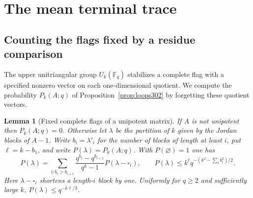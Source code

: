\documentclass[a4paper,11pt]{article}
\newtheorem{lemma}[proposition]{Lemma}
\theoremstyle{definition}
\theoremstyle{remark}
\numberwithin{equation}{section}
\begin{document}
\section{The mean terminal trace}\label{nav:g-XI-3}


\subsection{Counting the flags fixed by a residue comparison}\label{nav:III-65}
The upper unitriangular group \(U_k(\mathbb F_q)\) stabilizes
a complete flag with a specified nonzero vector on each
one-dimensional quotient. We compute the probability
\(P_k(A;q)\) of Proposition~\ref{prop:loops302} by forgetting
these quotient vectors.

\begin{lemma}[Fixed complete flags of a unipotent matrix]\leavevmode
\label{lem:fixedflags302}
If \(A\) is not unipotent then \(P_k(A;q)=0\).
Otherwise let \(\lambda\) be the partition of \(k\) given
by the Jordan blocks of \(A-1\). Write \(b_i=\lambda'_i\)
for the number of blocks of length at least \(i\), put
\(\ell=k-b_1\), and write \(P(\lambda)=P_k(A;q)\).
With \(P(\varnothing)=1\) one has
\[
 P(\lambda)=\sum_{i:b_i>b_{i+1}}
         \frac{q^{b_i}-q^{b_{i+1}}}{q^k-1}
         P(\lambda-\square_i),\qquad
 P(\lambda)\le k^\ell q^{-(k^2-\sum_i b_i^2)/2}.
\]
Here \(\lambda-\square_i\) shortens a length-\(i\) block
by one. Uniformly for \(q\ge2\) and sufficiently large \(k\),
\(P(\lambda)\le q^{-k\ell/3}\).
\end{lemma}
\end{document}
